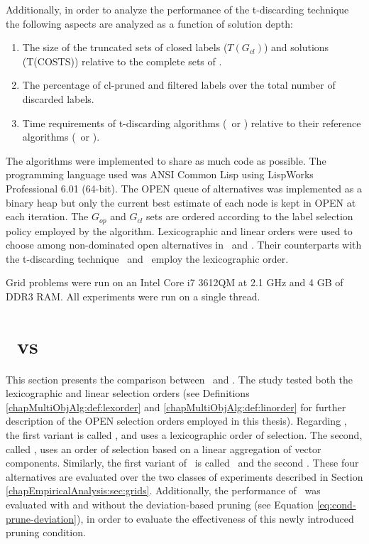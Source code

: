 Additionally, in order to analyze the performance of the t-discarding technique 
the following aspects are analyzed as a function of solution depth:

\begin{enumerate}
    \item The size of the truncated sets of closed labels ($T(G_{cl})$) and solutions (T(COSTS)) relative to the complete sets of \namoa. 
	 \item The percentage of cl-pruned and filtered labels over the total number of discarded labels.
	 \item Time requirements of t-discarding algorithms (\namoate \ or \lexgote) relative to their reference algorithms (\namoa \ or \lexgo).
\end{enumerate}  

The algorithms were implemented to share as much code as possible. The programming language used was ANSI Common Lisp using LispWorks Professional 6.01 (64-bit). The OPEN queue of alternatives was implemented as a binary heap but only the current best estimate of each node is kept in OPEN at each iteration. The $G_{op}$ and $G_{cl}$ sets are ordered according to the label selection policy employed by the algorithm. Lexicographic and linear orders were used to choose among non-dominated open alternatives in \namoa \ and \lexgo. Their counterparts with the t-discarding technique \namoate \ and \lexgote \ employ the lexicographic order.

Grid problems were run on an Intel Core i7 3612QM at 2.1 GHz and 4 GB of DDR3 RAM. All experiments were run on a single thread.

\section{\texorpdfstring{\lexgo}{LEXGO*} \ vs \texorpdfstring{\namoa}{NAMOA*}}
\label{chapEmpiricalAnalysis:sec:resultsgridslexgo}

This section presents the comparison between \namoa \ and \lexgo. The study tested both the lexicographic and linear selection orders (see Definitions \ref{chapMultiObjAlg:def:lexorder} and \ref{chapMultiObjAlg:def:linorder} for further description of the OPEN selection orders employed in this thesis). Regarding \namoa, the first variant is called \namoalex, and uses a lexicographic order of selection. The second, called \namoalin, uses an order of selection based on a linear aggregation of vector components. Similarly, the first variant of \lexgo \ is called \lexgolex \ and the second \lexgolin. These four alternatives are evaluated over the two classes of experiments described in Section \ref{chapEmpiricalAnalysis:sec:grids}. Additionally, the performance of \lexgo \ was evaluated with and without the deviation-based pruning (see Equation \ref{eq:cond-prune-deviation}), in order to evaluate the effectiveness of this newly introduced pruning condition.

